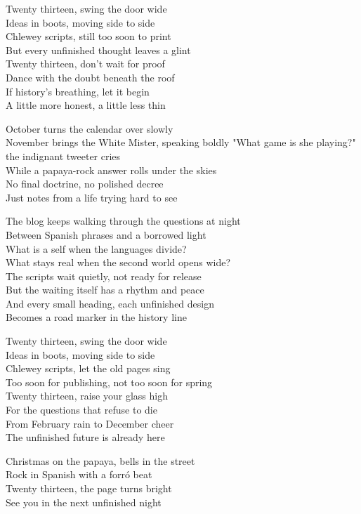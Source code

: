 \begin{lyrics}
Twenty thirteen, swing the door wide\\
Ideas in boots, moving side to side\\
Chlewey scripts, still too soon to print\\
But every unfinished thought leaves a glint\\
Twenty thirteen, don't wait for proof\\
Dance with the doubt beneath the roof\\
If history's breathing, let it begin\\
A little more honest, a little less thin

October turns the calendar over slowly\\
November brings the White Mister, speaking boldly
"What game is she playing?" the indignant tweeter cries\\
While a papaya-rock answer rolls under the skies\\
No final doctrine, no polished decree\\
Just notes from a life trying hard to see

The blog keeps walking through the questions at night\\
Between Spanish phrases and a borrowed light\\
What is a self when the languages divide?\\
What stays real when the second world opens wide?\\
The scripts wait quietly, not ready for release\\
But the waiting itself has a rhythm and peace\\
And every small heading, each unfinished design\\
Becomes a road marker in the history line

Twenty thirteen, swing the door wide\\
Ideas in boots, moving side to side\\
Chlewey scripts, let the old pages sing\\
Too soon for publishing, not too soon for spring\\
Twenty thirteen, raise your glass high\\
For the questions that refuse to die\\
From February rain to December cheer\\
The unfinished future is already here

Christmas on the papaya, bells in the street\\
Rock in Spanish with a forró beat\\
Twenty thirteen, the page turns bright\\
See you in the next unfinished night
\end{lyrics}

